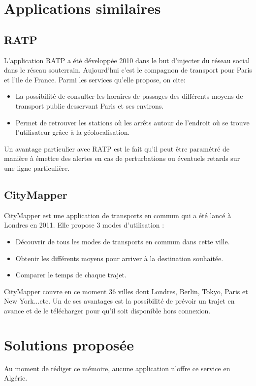 \section{Applications similaires}			
\subsection{RATP}
L'application RATP a été développée 2010 dans le but d'injecter du réseau social dans le réseau souterrain. Aujourd'hui c'est le compagnon de transport pour Paris et l'ile de France.
Parmi les services qu'elle propose, on cite:
\begin{itemize}
	\item La possibilité de consulter les horaires de passages des différents moyens de transport public desservant Paris et ses environs. 
	\item Permet de retrouver les stations où les arrêts autour de l'endroit où se trouve l'utilisateur grâce à la géolocalisation.
\end{itemize}
Un avantage particulier avec RATP est le fait qu'il peut être paramétré de manière à émettre des alertes en cas de perturbations ou éventuels retards sur une ligne particulière.
	
\subsection{CityMapper}
CityMapper est une application de transports en commun qui a été lancé à Londres en 2011.
Elle propose 3 modes d'utilisation : 
\begin{itemize}
	\item Découvrir de tous les modes de transports en commun dans cette ville.
	\item Obtenir les différents moyens pour arriver à la destination souhaitée.
	\item Comparer le temps de chaque trajet.
\end{itemize}

CityMapper couvre en ce moment 36 villes dont Londres, Berlin, Tokyo, Paris et New York...etc.  Un de ses avantages est la possibilité de prévoir un trajet en avance et de le télécharger pour qu'il soit disponible hors connexion.

\section{Solutions proposée}
Au moment de rédiger ce mémoire, aucune application n'offre ce service en Algérie.

